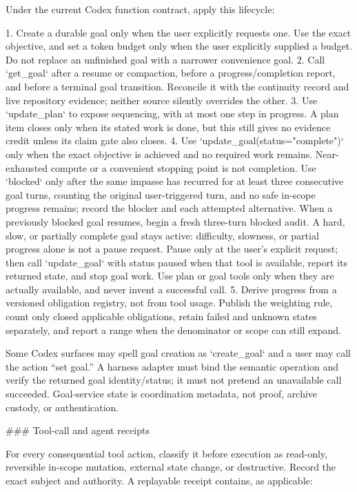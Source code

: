 \documentclass[11pt]{article}
\begin{document}
\begin{markdown}
Under the current Codex function contract, apply this lifecycle:

1. Create a durable goal only when the user explicitly requests one. Use the exact objective, and
   set a token budget only when the user explicitly supplied a budget. Do not replace an unfinished
   goal with a narrower convenience goal.
2. Call `get_goal` after a resume or compaction, before a progress/completion report, and before a
   terminal goal transition. Reconcile it with the continuity record and live repository evidence;
   neither source silently overrides the other.
3. Use `update_plan` to expose sequencing, with at most one step in progress. A plan item closes
   only when its stated work is done, but this still gives no evidence credit unless its claim gate
   also closes.
4. Use `update_goal(status="complete")` only when the exact objective is achieved and no required
   work remains. Near-exhausted compute or a convenient stopping point is not completion. Use
   `blocked` only after the same impasse has recurred for at least three consecutive goal turns,
   counting the original user-triggered turn, and no safe in-scope progress remains; record the
   blocker and each attempted alternative. When a previously blocked goal resumes, begin a fresh
   three-turn blocked audit. A hard, slow, or partially complete goal stays active: difficulty,
   slowness, or partial progress alone is not a pause request. Pause only at the user's explicit
   request; then call `update_goal` with status paused when that tool is available, report its
   returned state, and stop goal work. Use plan or goal tools only when they are actually
   available, and never invent a successful call.
5. Derive progress from a versioned obligation registry, not from tool usage. Publish the weighting
   rule, count only closed applicable obligations, retain failed and unknown states separately, and
   report a range when the denominator or scope can still expand.

Some Codex surfaces may spell goal creation as `create_goal` and a user may call the action
“set goal.” A harness adapter must bind the semantic operation and verify the returned goal
identity/status; it must not pretend an unavailable call succeeded. Goal-service state is
coordination metadata, not proof, archive custody, or authentication.

### Tool-call and agent receipts

For every consequential tool action, classify it before execution as read-only, reversible
in-scope mutation, external state change, or destructive. Record the exact subject and authority.
A replayable receipt contains, as applicable:


\end{markdown}
\end{document}
